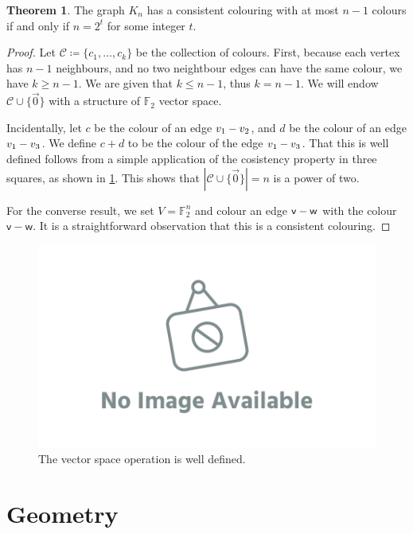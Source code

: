 \documentclass[12pt]{amsart}
\theoremstyle{definition}
\newtheorem{thm}{Theorem}[section]
\newcommand{\F}{\mathbb{F}}
\newcommand{\CC}{\mathcal C}
\newcommand{\vv}{\mathsf{v}}
\newcommand{\vw}{\mathsf{w}}
\begin{document}
\begin{thm}
The graph $K_n$ has a consistent colouring with at most $n-1$ colours if and only if $n = 2^t $ for some integer $t$.
\end{thm}

\begin{proof}
Let $\CC \coloneqq\{ c_1, \dots, c_k\}$ be the collection of colours.
First, because each vertex has $n-1$ neighbours, and no two neightbour edges can have the same colour, we have $k \geq n-1$.
We are given that $k \leq n-1$, thus $k = n-1$. 
We will endow $\CC \cup \{\vec{0}\}$ with a structure of $\F_2$ vector space.

Incidentally, let $c$ be the colour of an edge $v_1 \-- v_2$, and $d$ be the colour of an edge $v_1 \-- v_3$.
We define $c + d $ to be the colour of the edge $v_1 \-- v_3$.
That this is well defined follows from a simple application of the cosistency property in three squares, as shown in \cref{fig:consistency_squares}.
This shows that $|\CC \cup \{\vec{0}\}| = n$ is a power of two.

For the converse result, we set $V = \F_2^n$ and colour an edge $\vv \-- \vw$ with the colour $\vv - \vw$.
It is a straightforward observation that this is a consistent colouring.
\end{proof}

\begin{figure}[h]
\includegraphics[scale=.1]{../imgs/ina.png}%
\caption{The vector space operation is well defined.\label{fig:consistency_squares}}
\end{figure}


\section{Geometry}
\end{document}
